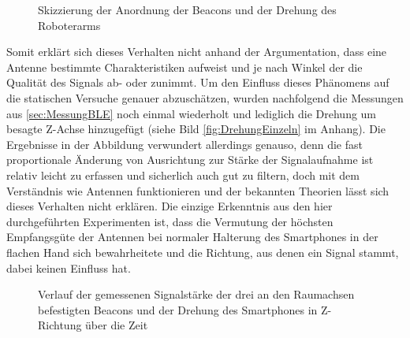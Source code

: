 \begin{figure}
\caption{Skizzierung der Anordnung der Beacons und der Drehung des Roboterarms}
\label{fig:DrehungSkizze}
\end{figure}
Somit erklärt sich dieses Verhalten nicht anhand der Argumentation, dass eine Antenne bestimmte Charakteristiken aufweist und je nach Winkel der die Qualität des Signals ab- oder zunimmt. Um den Einfluss dieses Phänomens auf die statischen Versuche genauer abzuschätzen, wurden nachfolgend die Messungen aus \ref{sec:MessungBLE} noch einmal wiederholt und lediglich die Drehung um besagte Z-Achse hinzugefügt (siehe Bild \ref{fig:DrehungEinzeln} im Anhang). Die Ergebnisse in der Abbildung verwundert allerdings genauso, denn die fast proportionale Änderung von Ausrichtung zur Stärke der Signalaufnahme ist relativ leicht zu erfassen und sicherlich auch gut zu filtern, doch mit dem Verständnis wie Antennen funktionieren und der bekannten Theorien lässt sich dieses Verhalten nicht erklären. Die einzige Erkenntnis aus den hier durchgeführten Experimenten ist, dass die Vermutung der höchsten Empfangsgüte der Antennen bei normaler Halterung des Smartphones in der flachen Hand sich bewahrheitete und die Richtung, aus denen ein Signal stammt, dabei keinen Einfluss hat.
\begin{figure}[H] 
\centering
{}
\caption{Verlauf der gemessenen Signalstärke der drei an den Raumachsen befestigten Beacons und der Drehung des Smartphones in Z-Richtung über die Zeit}
\label{fig:DrehungAlle}
\end{figure}
